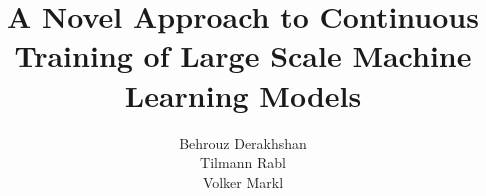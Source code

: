 \documentclass{vldb}
\begin{document}





%

\title{A Novel Approach to Continuous Training of Large Scale Machine Learning Models}

%
%
%
%
%

%
\author{
\alignauthor
Behrouz Derakhshan\\
\alignauthor
Tilmann Rabl \\
\alignauthor 
Volker Markl\\
}
\end{document}
